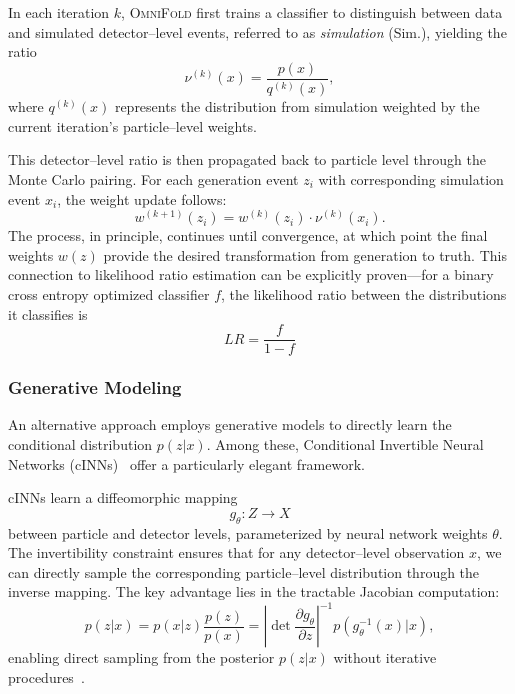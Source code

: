             In each iteration \(k\), \textsc{OmniFold} first trains a classifier to distinguish between data and simulated detector--level events, referred to as \emph{simulation} (Sim.), yielding the ratio
            \begin{equation}
                \nu^{(k)}(x) = \frac{p(x)}{q^{(k)}(x)},
            \end{equation}
            where \(q^{(k)}(x)\) represents the distribution from simulation weighted by the current iteration's particle--level weights.

            This detector--level ratio is then propagated back to particle level through the Monte Carlo pairing.
            For each generation event \(z_i\) with corresponding simulation event \(x_i\), the weight update follows:
            \begin{equation}
                w^{(k+1)}(z_i) = w^{(k)}(z_i) \cdot \nu^{(k)}(x_i).
            \end{equation}
            The process, in principle, continues until convergence, at which point the final weights \(w(z)\) provide the desired transformation from generation to truth.
            This connection to likelihood ratio estimation can be explicitly proven---for a binary cross entropy optimized classifier \(f\), the likelihood ratio between the distributions it classifies is
            \[
                LR = \frac{f}{1-f}
            \]
        \subsubsection{Generative Modeling}
            An alternative approach employs generative models to directly learn the conditional distribution \(p(z|x)\).
            Among these, Conditional Invertible Neural Networks (cINNs)~\cite{AnanthaPadmanabha2021SolvingNetworks} offer a particularly elegant framework.
            
            cINNs learn a diffeomorphic mapping \[g_\theta: {Z} \to {X}\] between particle and detector levels, parameterized by neural network weights \(\theta\).
            The invertibility constraint ensures that for any detector--level observation \(x\), we can directly sample the corresponding particle--level distribution through the inverse mapping.
            The key advantage lies in the tractable Jacobian computation:
            \begin{equation}
                p(z|x) = p(x|z) \frac{p(z)}{p(x)} = \left|\det \frac{\partial g_\theta}{\partial z}\right|^{-1} p(g_\theta^{-1}(x)|x),
            \end{equation}
            enabling direct sampling from the posterior \(p(z|x)\) without iterative procedures~\cite{Bellagente2020InvertibleAgain}.

